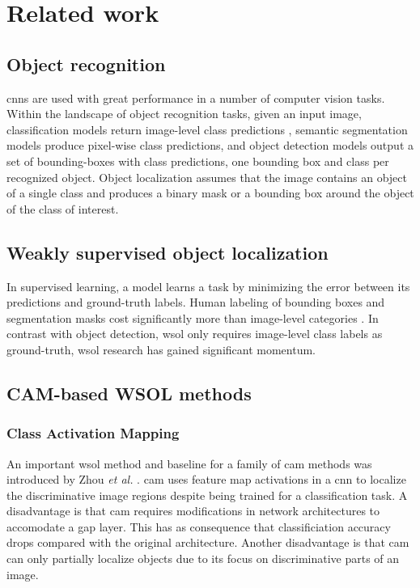 \chapter{Related work} \label{ch:related_work}
\section{Object recognition}
\acrfull{cnn}s are used with great performance in a number of computer vision tasks. Within the landscape of object recognition tasks, given an input image, classification models return image-level class predictions \cite{lecun1998gradient}, semantic segmentation models \cite{shelhamer2017fully} produce pixel-wise class predictions, and object detection models \cite{girshick2014rich, girshick2015fast, ren2015faster} output a set of bounding-boxes with class predictions, one bounding box and class per recognized object. Object localization \cite{russakovsky2015imagenet} assumes that the image contains an object of a single class and produces a binary mask or a bounding box around the object of the class of interest.

\section{Weakly supervised object localization}
In supervised learning, a model learns a task by minimizing the error between its predictions and ground-truth labels. Human labeling of bounding boxes and segmentation masks cost significantly more than image-level categories \cite{papandreou2015weakly}. In contrast with object detection, \acrshort{wsol} only requires image-level class labels as ground-truth, \acrshort{wsol} research \cite{zhou2016cvpr, zhang2018adversarial, zhang2018self, choe2019attention, singh2017hide} has gained significant momentum.

\section{CAM-based WSOL methods}
\subsection{Class Activation Mapping}
An important \acrshort{wsol} method and baseline for a family of \acrshort{cam} methods was introduced by Zhou \textit{et al.} \cite{zhou2016cvpr}. \acrfull{cam} uses feature map activations in a \acrlong{cnn} to localize the discriminative image regions despite being trained for a classification task. A disadvantage is that \acrshort{cam} requires modifications in network architectures to accomodate a \acrlong{gap} layer. This has as consequence that classificiation accuracy drops compared with the original architecture. Another disadvantage is that \acrshort{cam} can only partially localize objects due to its focus on discriminative parts of an image. 

